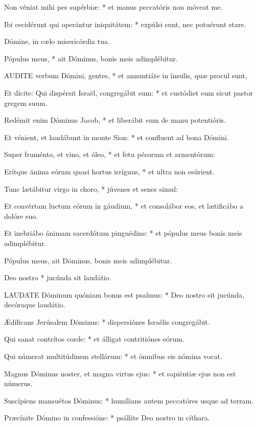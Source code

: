 Non véniat mihi pes supérbiæ: * et manus peccatóris non móveat me.

Ibi cecidérunt qui operántur iniquitátem: * expúlsi sunt, nec potuérunt stare.

 Dómine, in cælo misericórdia tua.

 Pópulus meus, * ait Dóminus, bonis meis adimplébitur.


\lettrine[lines=2]{A}{UDITE} verbum Dómini, gentes, * et annuntiáte in ínsulis, quæ procul sunt,

Et dícite: Qui dispérsit Israël, congregábit eum: * et custódiet eum sicut pastor gregem suum.

Redémit enim Dóminus Jacob, * et liberábit eum de manu potentióris.

Et vénient, et laudábunt in monte Sion: * et confluent ad bona Dómini.

Super fruménto, et vino, et óleo, * et fetu pécorum et armentórum:

Erítque ánima eórum quasi hortus irríguus, * et ultra non esúrient.

Tunc lætábitur virgo in choro, * júvenes et senes simul:

Et convértam luctum eórum in gáudium, * et consolábor eos, et lætificábo a dolóre suo.

Et inebriábo ánimam sacerdótum pinguédine: * et pópulus meus bonis meis adimplébitur.

 Pópulus meus, ait Dóminus, bonis meis adimplébitur.

 Deo nostro * jucúnda sit laudátio.


\lettrine[lines=2]{L}{AUDATE} Dóminum quóniam bonus est psalmus: * Deo nostro sit jucúnda, decóraque laudátio.

Ædíficans Jerúsalem Dóminus: * dispersiónes Israélis congregábit.

Qui sanat contrítos corde: * et álligat contritiónes eórum.

Qui númerat multitúdinem stellárum: * et ómnibus eis nómina vocat.

Magnus Dóminus noster, et magna virtus ejus: * et sapiéntiæ ejus non est númerus.

Suscípiens mansuétos Dóminus: * humílians autem peccatóres usque ad terram.

Præcínite Dómino in confessióne: * psállite Deo nostro in cíthara.

